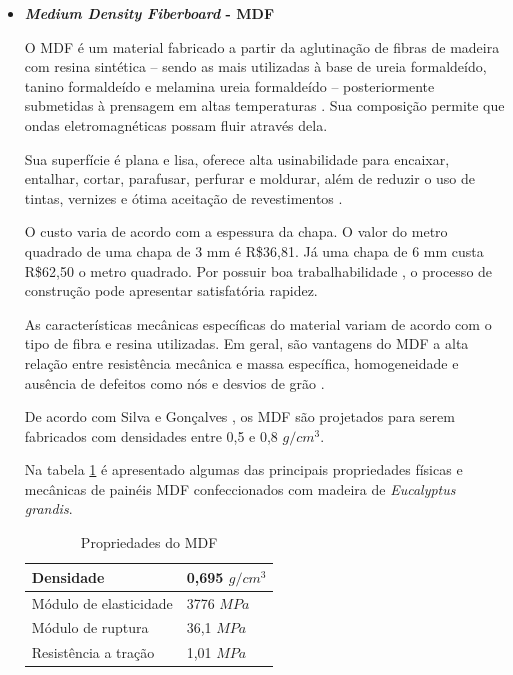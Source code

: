 \begin{itemize}
    \item \textbf{\textit{Medium Density Fiberboard} - MDF}
     \par O MDF é um material fabricado a partir da aglutinação de fibras de madeira com resina sintética – sendo as mais utilizadas à base de ureia formaldeído, tanino formaldeído e melamina ureia formaldeído –  posteriormente submetidas à prensagem em altas temperaturas  \cite{gomes}.  Sua composição permite que ondas eletromagnéticas possam fluir através dela.
     
    \par Sua superfície é plana e lisa, oferece alta usinabilidade para encaixar, entalhar, cortar, parafusar, perfurar e moldurar, além de reduzir o uso de tintas, vernizes e ótima aceitação de revestimentos \cite{CAMPOS}.
    
    \par O custo varia de acordo com a espessura da chapa. O valor do metro quadrado de uma chapa de 3 mm é R\$36,81. Já uma chapa de 6 mm custa R\$62,50 o metro quadrado.  Por possuir boa trabalhabilidade \cite{eleoterio2000propriedades}, o processo de construção pode apresentar satisfatória rapidez.  
    
    \par As características mecânicas específicas do material variam de acordo com o tipo de fibra e resina utilizadas. Em geral, são vantagens do MDF a alta relação entre resistência mecânica e massa específica, homogeneidade e ausência de defeitos como nós e desvios de grão \cite{eleoterio2000propriedades}. 
    
    \par De acordo com Silva e Gonçalves \cite{da2007avaliaccao}, os MDF são projetados para serem fabricados com densidades entre 0,5 e 0,8 $g/cm^3$. 
    
    \par Na tabela \ref{tab:mdf} é apresentado algumas das principais propriedades físicas e mecânicas de painéis MDF confeccionados com madeira de \textit{Eucalyptus grandis}.
    
\begin{table}[h]
\centering
\begin{tabular}{|l|l|}
\hline
Densidade              & 0,695 $g/cm^3$ \\ \hline
Módulo de elasticidade & 3776 $MPa$ \\ \hline
Módulo de ruptura      & 36,1 $MPa$ \\ \hline
Resistência a tração   & 1,01 $MPa$ \\ \hline
\end{tabular}
\caption{Propriedades do MDF}
\label{tab:mdf}
\end{table}


\end{itemize}
